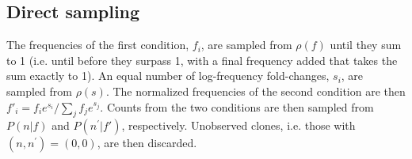 \documentclass[letterpaper,english,prl,reprint,longbibliography]{revtex4-1} %
\begin{document}
\subsection*{Direct sampling}
The frequencies of the first condition, $f_i$, are sampled from $\rho(f)$ until they sum to 1 (i.e. until before they surpass 1, with a final frequency added that takes the sum exactly to 1). An equal number of log-frequency fold-changes, $s_i$, are sampled from $\rho(s)$. The normalized frequencies of the second condition are then $f'_i=f_ie^{s_i}/\sum_j f_je^{s_j}$.  Counts from the two conditions are then sampled from $P(n|f)$ and $P(n^{\prime}|f')$, respectively. Unobserved clones, i.e. those with $(n,n^{\prime})=(0,0)$, are then discarded.

% 
% 
% 
\end{document}
